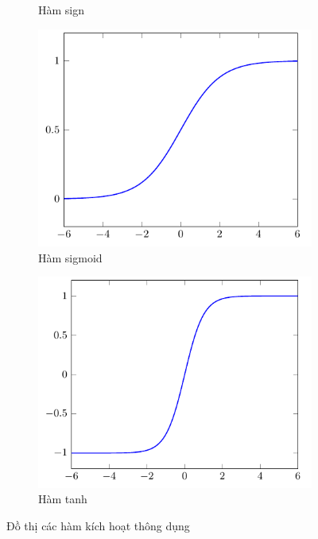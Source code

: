 \begin{figure}[htb]
\begin{subfigure}[htbp]{0.25\textwidth}
        \caption{Hàm sign}
    \end{subfigure}%
    \begin{subfigure}[htbp]{0.25\textwidth}
        \centering
        \includegraphics[width=\textwidth]{tikz_image/sigmoid.pdf}
        \caption{Hàm sigmoid}
    \end{subfigure}%
    \begin{subfigure}[htbp]{0.25\textwidth}
        \centering
        \includegraphics[width=\textwidth]{tikz_image/tanh.pdf}
        \caption{Hàm tanh}
    \end{subfigure}%
    \caption{Đồ thị các hàm kích hoạt thông dụng}
    \label{figure:activation-funtion-1}
\end{figure}

